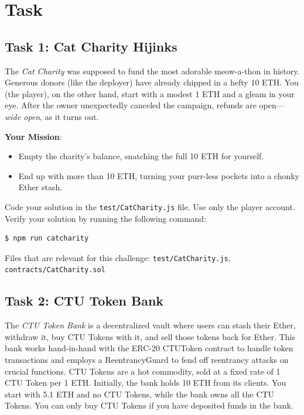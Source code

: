 \documentclass[12pt]{article}
\begin{document}
\section{Task}

\subsection*{Task 1: Cat Charity Hijinks}

The \emph{Cat Charity} was supposed to fund the most adorable meow-a-thon in
history. Generous donors (like the deployer) have already chipped in a hefty 10
ETH. You (the player), on the other hand, start with a modest 1 ETH and a gleam
in your eye. After the owner unexpectedly canceled the campaign, refunds are
open—\emph{wide open}, as it turns out.

\medskip
\noindent
\textbf{Your Mission}:
\begin{itemize}
    \item Empty the charity's balance, snatching the full 10 ETH for yourself.
    \item End up with more than 10 ETH, turning your purr-less pockets into a chonky
          Ether stash.
\end{itemize}

\noindent
Code your solution in the \texttt{test/CatCharity.js} file. Use only the player account. Verify your solution by running the following command:

\begin{verbatim}
$ npm run catcharity
\end{verbatim}

\noindent
Files that are relevant for this challenge: \texttt{test/CatCharity.js}, \texttt{contracts/CatCharity.sol}

\subsection*{Task 2: CTU Token Bank}

The \emph{CTU Token Bank} is a decentralized vault where users can stash their
Ether, withdraw it, buy CTU Tokens with it, and sell those tokens back for
Ether. This bank works hand-in-hand with the ERC-20 CTUToken contract to handle
token transactions and employs a ReentrancyGuard to fend off reentrancy
attacks on crucial functions. CTU Tokens are a hot commodity, sold at a fixed
rate of 1 CTU Token per 1 ETH. Initially, the bank holds 10 ETH from its
clients. You start with 5.1 ETH and no CTU Tokens, while the bank owns all the
CTU Tokens. You can only buy CTU Tokens if you have deposited funds in the
bank.
\end{document}
